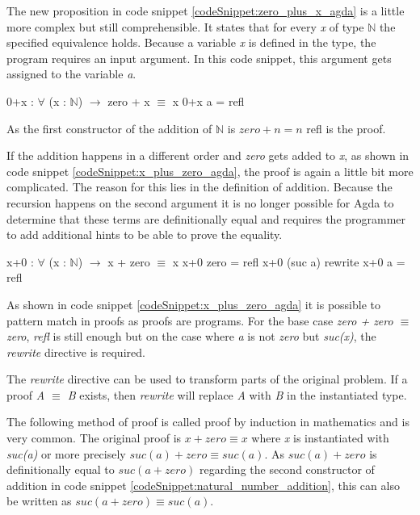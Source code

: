 The new proposition in code snippet \ref{codeSnippet:zero_plus_x_agda} is a little more complex but still comprehensible. 
It states that for every \emph{x} of type $\mathbb{N}$ the specified equivalence holds. 
Because a variable \emph{x} is defined in the type, the program requires an input argument.
In this code snippet, this argument gets assigned to the variable \emph{a}.

\begin{codesnippet}[mathescape=true, caption={Proof of addition to zero}, label={codeSnippet:zero_plus_x_agda}]
0+x : $\forall$ (x : $\mathbb{N}$) $\rightarrow$ zero + x $\equiv$ x
0+x a = refl
\end{codesnippet}

As the first constructor of the addition of $\mathbb{N}$ is $zero + n = n$ refl is the proof.

If the addition happens in a different order and \emph{zero} gets added to \emph{x}, as shown in code snippet \ref{codeSnippet:x_plus_zero_agda}, the proof is again a little bit more complicated. 
The reason for this lies in the definition of addition.
Because the recursion happens on the second argument it is no longer possible for Agda to determine that these terms are definitionally equal and requires the programmer to add additional hints to be able to prove the equality.

\begin{codesnippet}[mathescape=true, caption={Proof of addition of zero}, label={codeSnippet:x_plus_zero_agda}]
x+0 : $\forall$ (x : $\mathbb{N}$) $\rightarrow$ x + zero $\equiv$ x
x+0 zero = refl
x+0 (suc a) rewrite x+0 a = refl
\end{codesnippet}

As shown in code snippet \ref{codeSnippet:x_plus_zero_agda} it is possible to pattern match in proofs as proofs are programs.
For the base case \emph{zero + zero $\equiv$ zero}, \emph{refl} is still enough but on the case where \emph{a} is not \emph{zero} but \emph{suc(x)}, the \emph{rewrite} directive is required.

The \emph{rewrite} directive can be used to transform parts of the original problem. If a proof \emph{A $\equiv$ B} exists, then \emph{rewrite} will replace \emph{A} with \emph{B} in the instantiated type.

The following method of proof is called proof by induction in mathematics and is very common.
The original proof is $x + zero \equiv x$ where \emph{x} is instantiated with \emph{suc(a)} or more precisely $suc(a) + zero \equiv suc(a)$.
As $suc(a) + zero$ is definitionally equal to $suc(a + zero)$ regarding the second constructor of addition in code snippet \ref{codeSnippet:natural_number_addition}, this can also be written as $suc(a + zero) \equiv suc(a)$.

